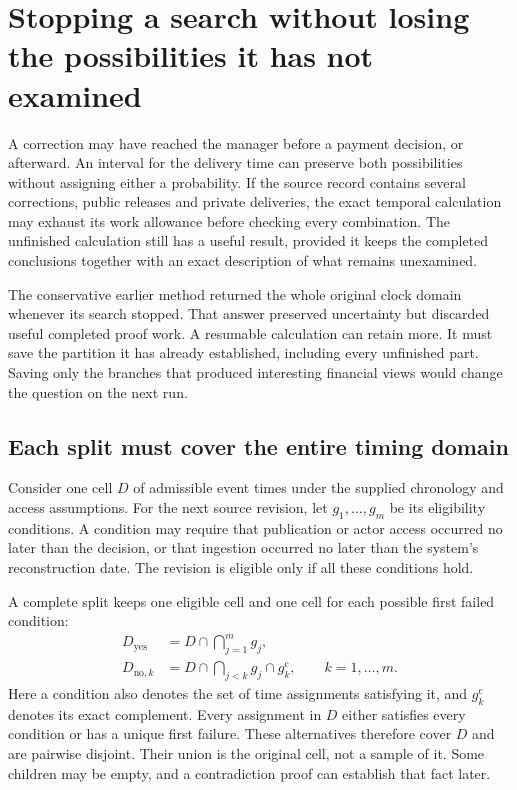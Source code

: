 \section{Stopping a search without losing the possibilities it has not examined}
\label{sim:release-temporal-frontier}
\label{sim:temporal-frontier}

A correction may have reached the manager before a payment decision, or afterward. An interval for the delivery time can preserve both possibilities without assigning either a probability. If the source record contains several corrections, public releases and private deliveries, the exact temporal calculation may exhaust its work allowance before checking every combination. The unfinished calculation still has a useful result, provided it keeps the completed conclusions together with an exact description of what remains unexamined.

The conservative earlier method returned the whole original clock domain whenever its search stopped. That answer preserved uncertainty but discarded useful completed proof work. A resumable calculation can retain more. It must save the partition it has already established, including every unfinished part. Saving only the branches that produced interesting financial views would change the question on the next run.

\subsection{Each split must cover the entire timing domain}

Consider one cell $D$ of admissible event times under the supplied chronology and access assumptions. For the next source revision, let $g_1,\ldots,g_m$ be its eligibility conditions. A condition may require that publication or actor access occurred no later than the decision, or that ingestion occurred no later than the system's reconstruction date. The revision is eligible only if all these conditions hold.

A complete split keeps one eligible cell and one cell for each possible first failed condition:
\begin{align}
 D_{\mathrm{yes}} &= D\cap\bigcap_{j=1}^{m}g_j,\\
 D_{\mathrm{no},k} &= D\cap\bigcap_{j<k}g_j\cap g_k^{\mathrm c},
 \qquad k=1,\ldots,m.
\end{align}
Here a condition also denotes the set of time assignments satisfying it, and $g_k^{\mathrm c}$ denotes its exact complement. Every assignment in $D$ either satisfies every condition or has a unique first failure. These alternatives therefore cover $D$ and are pairwise disjoint. Their union is the original cell, not a sample of it. Some children may be empty, and a contradiction proof can establish that fact later.

